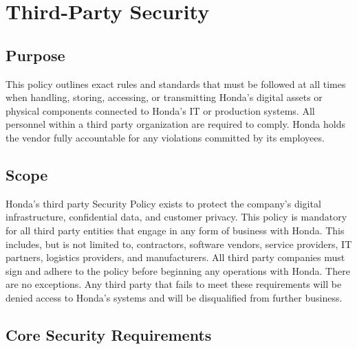 \chapter{Third-Party Security}
\pagestyle{fancy}

\fancyhf{}

\fancyfoot[C]{\thepage}

\renewcommand{\headrulewidth}{0pt}
\renewcommand{\footrulewidth}{0pt}


\section{Purpose}
This policy outlines exact rules and standards that must be followed at all times when handling, storing, accessing, or transmitting Honda’s digital assets or physical components connected to Honda’s IT or production systems. All personnel within a third party organization are required to comply. Honda holds the vendor fully accountable for any violations committed by its employees.

\section{Scope}
Honda’s third party Security Policy exists to protect the company’s digital infrastructure, confidential data, and customer privacy. This policy is mandatory for all third party entities that engage in any form of business with Honda. This includes, but is not limited to, contractors, software vendors, service providers, IT partners, logistics providers, and manufacturers. 		All third party companies must sign and adhere to the policy before beginning any operations with Honda. There are no exceptions. Any third party that fails to meet these requirements will be denied access to Honda’s systems and will be disqualified from further business.

\section{Core Security Requirements}


